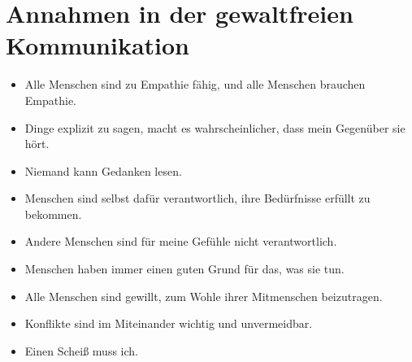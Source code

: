 \section{Annahmen in der gewaltfreien Kommunikation}

\begin{itemize}
  \item Alle Menschen sind zu Empathie fähig, und alle Menschen brauchen Empathie.
  \item Dinge explizit zu sagen, macht es wahrscheinlicher, dass mein Gegenüber sie hört.
  \item Niemand kann Gedanken lesen.
  \item Menschen sind selbst dafür verantwortlich, ihre Bedürfnisse erfüllt zu bekommen.
  \item Andere Menschen sind für meine Gefühle nicht verantwortlich.
  \item Menschen haben immer einen guten Grund für das, was sie tun.
  \item Alle Menschen sind gewillt, zum Wohle ihrer Mitmenschen beizutragen.
  \item Konflikte sind im Miteinander wichtig und unvermeidbar.
  \item Einen Scheiß muss ich.
\end{itemize}
